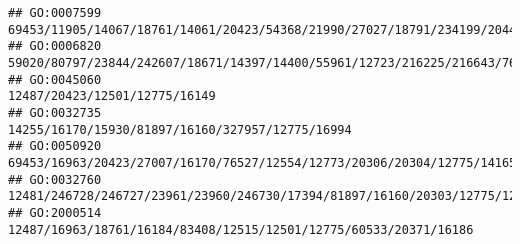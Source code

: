 \documentclass[
]{article}
\begin{document}
\begin{verbatim}
## GO:0007599                                                                                                                                                                                                                                                                                                   69453/11905/14067/18761/14061/20423/54368/21990/27027/18791/234199/20443/20533/71753/15160/100503895/11551
## GO:0006820                                                                                                                                                                                                                                                                                                         59020/80797/23844/242607/18671/14397/14400/55961/12723/216225/216643/76408/20533/218103/224796/24115
## GO:0045060                                                                                                                                                                                                                                                                                                                                                                                12487/20423/12501/12775/16149
## GO:0032735                                                                                                                                                                                                                                                                                                                                                             14255/16170/15930/81897/16160/327957/12775/16994
## GO:0050920                                                                                                                                                                                                                                                                                          69453/16963/20423/27007/16170/76527/12554/12773/20306/20304/12775/14165/110168/321019/19876/12458/11629/16149/12766
## GO:0032760                                                                                                                                                                                                                                                                                                                             12481/246728/246727/23961/23960/246730/17394/81897/16160/20303/12775/12475/12229
## GO:2000514                                                                                                                                                                                                                                                                                                                                            12487/16963/18761/16184/83408/12515/12501/12775/60533/20371/16186

\end{verbatim}
\end{document}

